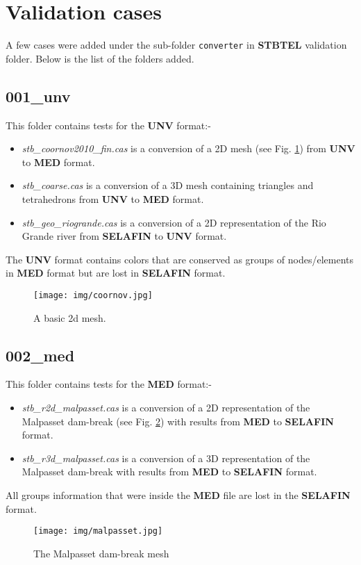 \documentclass[a4paper,10pt]{article}
\newcommand{\stb}{\textbf{STBTEL}\xspace}
\newcommand{\slf}{\textbf{SELAFIN}\xspace}
\newcommand{\unv}{\textbf{UNV}\xspace}
\newcommand{\med}{\textbf{MED}\xspace}
\begin{document}
\section{Validation cases}

A few cases were added under the sub-folder \verb+converter+ in \stb validation
folder.  Below is the list of the folders added.

\subsection{001\_unv}

This folder contains tests for the \unv format:-
\begin{itemize}
\item \textit{stb\_coornov2010\_fin.cas} is a conversion of a 2D mesh (see Fig.
\ref{coornov}) from \unv to \med format. 
\item \textit{stb\_coarse.cas} is a conversion of a 3D mesh containing
triangles and tetrahedrons from \unv to \med format.
\item \textit{stb\_geo\_riogrande.cas} is a conversion of a 2D representation
of the Rio Grande river from \slf to \unv format.
\end{itemize}
The \unv format contains colors that are conserved as groups of nodes/elements
in \med format but are lost in \slf format.

\begin{figure}[ht]
  \centering
  \texttt{[image: img/coornov.jpg]}
  \caption{A basic 2d mesh.}
  \label{coornov}
\end{figure}

\subsection{002\_med}

This folder contains tests for the \med format:-
\begin{itemize}
\item \textit{stb\_r2d\_malpasset.cas} is a conversion of a 2D representation
of the Malpasset dam-break (see Fig. \ref{malpasset}) with results from \med to
\slf format.
\item \textit{stb\_r3d\_malpasset.cas} is a conversion of a 3D representation
of the Malpasset dam-break with results from \med to \slf format.
\end{itemize}
All groups information that were inside the \med file are lost in the \slf
format.

\begin{figure}[ht]
  \centering
  \texttt{[image: img/malpasset.jpg]}
  \caption{The Malpasset dam-break mesh}
  \label{malpasset}
\end{figure}
\end{document}
